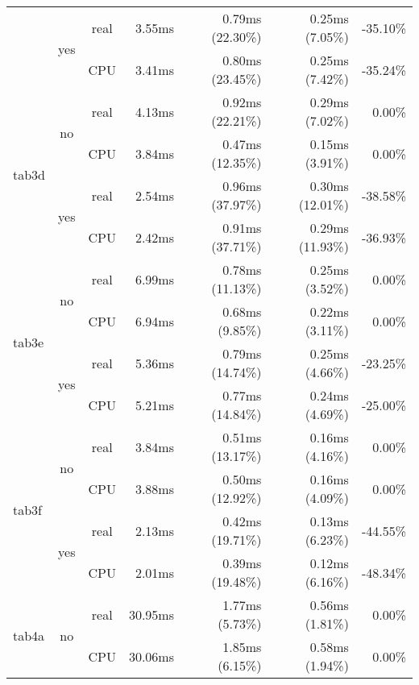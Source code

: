 \documentclass[en]{pracamgr}
\begin{document}
\begin{appendices}
\begin{small}
\begin{longtable}{|l|c|c|r|r|r|r|}
                          \cline{2-7}
                          & \multirow{2}{*}{yes} & real & 3.55ms & 0.79ms (22.30\%) & 0.25ms (7.05\%) & -35.10\% \\*
                          &                      & CPU  & 3.41ms & 0.80ms (23.45\%) & 0.25ms (7.42\%) & -35.24\% \\
\hline
\multirow{4}{*}{tab3d}    & \multirow{2}{*}{no}  & real & 4.13ms & 0.92ms (22.21\%) & 0.29ms (7.02\%) & 0.00\% \\*
                          &                      & CPU  & 3.84ms & 0.47ms (12.35\%) & 0.15ms (3.91\%) & 0.00\% \\*
                          \cline{2-7}
                          & \multirow{2}{*}{yes} & real & 2.54ms & 0.96ms (37.97\%) & 0.30ms (12.01\%) & -38.58\% \\*
                          &                      & CPU  & 2.42ms & 0.91ms (37.71\%) & 0.29ms (11.93\%) & -36.93\% \\
\hline
\multirow{4}{*}{tab3e}    & \multirow{2}{*}{no}  & real & 6.99ms & 0.78ms (11.13\%) & 0.25ms (3.52\%) & 0.00\% \\*
                          &                      & CPU  & 6.94ms & 0.68ms (9.85\%) & 0.22ms (3.11\%) & 0.00\% \\*
                          \cline{2-7}
                          & \multirow{2}{*}{yes} & real & 5.36ms & 0.79ms (14.74\%) & 0.25ms (4.66\%) & -23.25\% \\*
                          &                      & CPU  & 5.21ms & 0.77ms (14.84\%) & 0.24ms (4.69\%) & -25.00\% \\
\hline
\multirow{4}{*}{tab3f}    & \multirow{2}{*}{no}  & real & 3.84ms & 0.51ms (13.17\%) & 0.16ms (4.16\%) & 0.00\% \\*
                          &                      & CPU  & 3.88ms & 0.50ms (12.92\%) & 0.16ms (4.09\%) & 0.00\% \\*
                          \cline{2-7}
                          & \multirow{2}{*}{yes} & real & 2.13ms & 0.42ms (19.71\%) & 0.13ms (6.23\%) & -44.55\% \\*
                          &                      & CPU  & 2.01ms & 0.39ms (19.48\%) & 0.12ms (6.16\%) & -48.34\% \\
\hline
\multirow{4}{*}{tab4a}    & \multirow{2}{*}{no}  & real & 30.95ms & 1.77ms (5.73\%) & 0.56ms (1.81\%) & 0.00\% \\*
                          &                      & CPU  & 30.06ms & 1.85ms (6.15\%) & 0.58ms (1.94\%) & 0.00\% \\*

\end{longtable}
\end{small}
\end{appendices}
\end{document}
